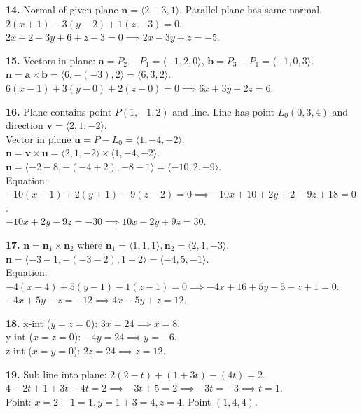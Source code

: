 \documentclass[12pt]{article}
\begin{document}
\textbf{14.} 
Normal of given plane $\mathbf{n} = \langle 2, -3, 1 \rangle$. Parallel plane has same normal. \\
$2(x+1) - 3(y-2) + 1(z-3) = 0$. \\
$2x + 2 - 3y + 6 + z - 3 = 0 \implies 2x - 3y + z = -5$.

\textbf{15.} 
Vectors in plane: $\mathbf{a} = P_2 - P_1 = \langle -1, 2, 0 \rangle$, $\mathbf{b} = P_3 - P_1 = \langle -1, 0, 3 \rangle$. \\
$\mathbf{n} = \mathbf{a} \times \mathbf{b} = \langle 6, -(-3), 2 \rangle = \langle 6, 3, 2 \rangle$. \\
$6(x-1) + 3(y-0) + 2(z-0) = 0 \implies 6x + 3y + 2z = 6$.

\textbf{16.} 
Plane contains point $P(1, -1, 2)$ and line. Line has point $L_0(0, 3, 4)$ and direction $\mathbf{v} = \langle 2, 1, -2 \rangle$. \\
Vector in plane $\mathbf{u} = P - L_0 = \langle 1, -4, -2 \rangle$. \\
$\mathbf{n} = \mathbf{v} \times \mathbf{u} = \langle 2, 1, -2 \rangle \times \langle 1, -4, -2 \rangle$. \\
$\mathbf{n} = \langle -2-8, -(-4+2), -8-1 \rangle = \langle -10, 2, -9 \rangle$. \\
Equation: $-10(x-1) + 2(y+1) - 9(z-2) = 0 \implies -10x + 10 + 2y + 2 - 9z + 18 = 0$. \\
$-10x + 2y - 9z = -30 \implies 10x - 2y + 9z = 30$.

\textbf{17.} 
$\mathbf{n} = \mathbf{n}_1 \times \mathbf{n}_2$ where $\mathbf{n}_1 = \langle 1, 1, 1 \rangle, \mathbf{n}_2 = \langle 2, 1, -3 \rangle$. \\
$\mathbf{n} = \langle -3-1, -(-3-2), 1-2 \rangle = \langle -4, 5, -1 \rangle$. \\
Equation: $-4(x-4) + 5(y-1) - 1(z-1) = 0 \implies -4x + 16 + 5y - 5 - z + 1 = 0$. \\
$-4x + 5y - z = -12 \implies 4x - 5y + z = 12$.

\textbf{18.} 
x-int ($y=z=0$): $3x=24 \implies x=8$. \\
y-int ($x=z=0$): $-4y=24 \implies y=-6$. \\
z-int ($x=y=0$): $2z=24 \implies z=12$.

\textbf{19.} 
Sub line into plane: $2(2-t) + (1+3t) - (4t) = 2$. \\
$4 - 2t + 1 + 3t - 4t = 2 \implies -3t + 5 = 2 \implies -3t = -3 \implies t = 1$. \\
Point: $x=2-1=1, y=1+3=4, z=4$. Point $(1, 4, 4)$.
\end{document}
